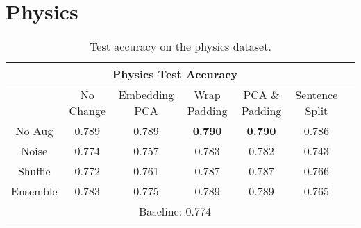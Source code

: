 \section{Physics}
  \begin{center}
    \begin{table}[H]
  \begin{tabular}{|c||c|c|c|c|c|c|}
   \hline
   \multicolumn{6}{|c|}{\textbf{Physics Test Accuracy}}\\ \hline
    & No Change & Embedding PCA & Wrap Padding & PCA \& Padding & Sentence Split\\  \hline
    No Aug & 0.789 & 0.789 & \textbf{0.790} & \textbf{0.790} & 0.786 \\ \hline
    Noise &  0.774 & 0.757 & 0.783 & 0.782 & 0.743  \\  \hline
    Shuffle & 0.772 & 0.761 & 0.787 & 0.787 & 0.766 \\      \hline
    Ensemble & 0.783 & 0.775 &  0.789 & 0.789 & 0.765 \\      \hline
    \multicolumn{6}{|c|}{Baseline: 0.774}\\ \hline
    \end{tabular}
    \caption{Test accuracy on the physics dataset.}
    \end{table}
    \end{center}


